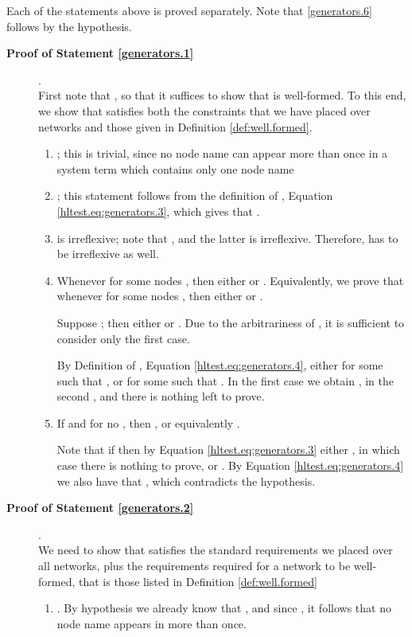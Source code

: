\documentclass{LMCS}
\begin{document}
Each of the statements above is proved separately. Note that \eqref{generators.6} 
follows by the hypothesis.

\begin{description}
\item[\textbf{Proof of Statement \ref{generators.1}}] .\\
First note that , so that it suffices 
to show that  is  well-formed.
To this end, we show that  satisfies both the constraints that 
we have placed over networks and those given in Definition \ref{def:well.formed}. 
\begin{enumerate}
\item ; this is trivial, since no node name can appear more 
than once in a system term which contains only one node name
\item ; this statement follows from the 
definition of ,  Equation \eqref{hltest.eq:generators.3}, which gives that .
\item  is irreflexive; note that , and the latter is irreflexive. Therefore,  has 
to be irreflexive as well.

\item Whenever  for 
some nodes , then either 
 or . 
Equivalently, we prove that whenever  
for some nodes , then either  or .

Suppose ; then either 
 or . 
Due to the arbitrariness of , it is sufficient to consider only the first case. 

By Definition of , Equation \eqref{hltest.eq:generators.4}, 
either  for some  such that , 
or  for some  such that . 
In the first case we obtain , in the second , and there is nothing left to prove.

\item If  and  for 
no , then , or 
equivalently . 

Note that if  then by Equation \eqref{hltest.eq:generators.3} either , 
in which case there is nothing to prove, or  
. By Equation \ref{hltest.eq:generators.4} we also 
have that , which contradicts the hypothesis.
\end{enumerate}

\item[\textbf{Proof of Statement \ref{generators.2}}] .\\
We need to show that  satisfies the standard requirements we placed over 
all networks, plus the requirements required for a network to be well-formed, that is those 
listed in Definition \ref{def:well.formed}
\begin{enumerate}
\item . 
By hypothesis we already know 
that , and since , it follows that 
no node name appears in  more than once.


\end{enumerate}
\end{description}
\end{document}
